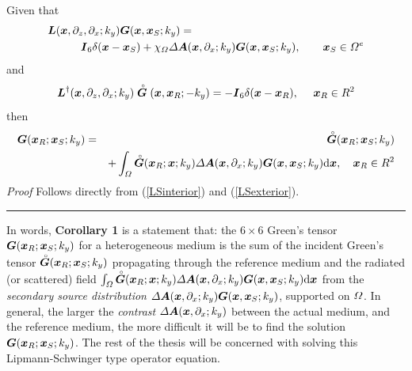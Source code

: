 {}\newline
Given that
 \begin{eqnarray*}
\lefteqn{{\bmi L}({\bmi x},\partial_{z},\partial_{x};k_y) {\bmi G}({\bmi
x},{\bmi x}_{S};k_y) =}\\
&& \qquad {\bmi I}_{6}\delta({\bmi x}-{\bmi x}_{S}) + 
{\chi}_{{{\mit \Omega}}} {\mit \Delta} {\bmi A}({\bmi
x},\partial_{x};k_y) {\bmi G}({\bmi x},{\bmi x}_{S};k_y),\qquad {\bmi 
x}_{S}\in{\mit \Omega}^{e}
\end{eqnarray*}
and
\begin{displaymath}
{\bmi L}^{\dagger}({\bmi x},\partial_{z},\partial_{x};k_y) \rf{\bmi G}({\bmi
x},{\bmi x}_{R};-k_y) = -{\bmi I}_{6}\delta({\bmi x}-{\bmi x}_{R}),\ \ \ \ {\bmi 
x}_{R}\in{R}^{2}
\end{displaymath}
then
\begin{eqnarray*}
{{\bmi G}}({\bmi x}_{R};{\bmi x}_{S};k_y)&=&
{\rf{\bmi G}}({\bmi x}_{R};{\bmi x}_{S};k_y)\\
&&+\int_{{\mit \Omega}} {\rf{\bmi G}}({\bmi x}_{R};{\bmi x};k_y)
{\mit \Delta} {\bmi A}({\bmi
x},\partial_{x};k_y) {\bmi G}({\bmi x},{\bmi x}_{S};k_y) {\rm d}{\bmi x},
\quad {\bmi x}_{R}\in R^{2}
\end{eqnarray*}
{\em Proof\/} Follows directly from (\ref{LSinterior}) and 
(\ref{LSexterior}).
\hfill \rule{11 pt}{11 pt}



 In words, 
{\bf Corollary 1} is a statement that:
 the $6 \times 6$ Green's tensor  ${{\bmi G}}({\bmi x}_{R};{\bmi 
x}_{S};k_y)$ for a heterogeneous medium is the sum of the incident 
Green's tensor ${\rf{\bmi G}}({\bmi x}_{R};{\bmi x}_{S};k_y)$ propagating 
through the reference medium
and the radiated (or scattered) field $\int_{{\mit \Omega}} {\rf{\bmi G}}({\bmi x}_{R};{\bmi x};k_y)
{\mit \Delta} {\bmi A}({\bmi
x},\partial_{x};k_y) {\bmi G}({\bmi x},{\bmi x}_{S};k_y) {\rm d}{\bmi x}$ 
from the {\em secondary source distribution\/} ${\mit \Delta} {\bmi A}({\bmi
x},\partial_{x};k_y) {\bmi G}({\bmi x},{\bmi x}_{S};k_y)$,  supported on 
${\mit \Omega}$. In general, the larger the {\em contrast\/} ${\mit \Delta} {\bmi A}({\bmi
x},\partial_{x};k_y)$ between the actual medium, and the reference medium, 
the more difficult it will be to find the solution 
${{\bmi G}}({\bmi x}_{R};{\bmi x}_{S};k_y)$. The rest of the thesis will be concerned with solving this 
Lipmann-Schwinger type operator equation.













